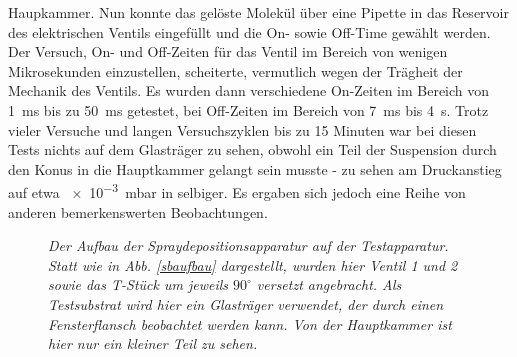  Haupkammer. Nun konnte das gelöste Molekül über eine Pipette in das Reservoir des elektrischen
 Ventils eingefüllt und die On- sowie Off-Time gewählt werden. Der Versuch, On- und Off-Zeiten für
 das Ventil im Bereich von wenigen Mikrosekunden einzustellen, scheiterte, vermutlich wegen der
 Trägheit der Mechanik des Ventils. Es wurden dann verschiedene On-Zeiten im Bereich von \SI{1}{ms}
 bis zu \SI{50}{ms} getestet, bei Off-Zeiten im Bereich von \SI{7}{ms} bis \SI{4}{s}. Trotz vieler
 Versuche und langen Versuchszyklen bis zu 15 Minuten war bei diesen Tests nichts auf dem
 Glasträger zu sehen, obwohl ein Teil der Suspension durch den Konus in die Hauptkammer gelangt
 sein musste - zu sehen am Druckanstieg auf etwa \SI{e-3}{mbar} in selbiger. Es ergaben sich jedoch
 eine Reihe von anderen bemerkenswerten Beobachtungen.
 \\

 
\begin{figure}[H]
	\centering
	\sffamily
	
	\caption{\textit{Der Aufbau der Spraydepositionsapparatur auf der Testapparatur. Statt wie in Abb.
	\ref{sbaufbau} dargestellt, wurden hier Ventil 1 und 2 sowie das T-Stück um jeweils $90^{\circ}$
	versetzt angebracht. Als Testsubstrat wird hier ein Glasträger verwendet, der durch einen
	Fensterflansch beobachtet werden kann. Von der Hauptkammer ist hier nur ein kleiner Teil zu
	sehen.}}
\label{aufbau}
\end{figure}
 
 


 

